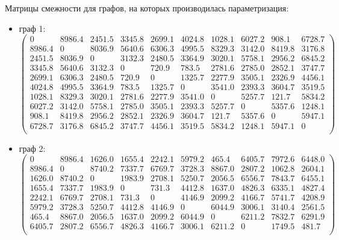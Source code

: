 Матрицы смежности для графов, на которых производилась параметризация:
\begin{itemize}
	\item граф 1:
	$$
	\begin{pmatrix}
		0 & 8986.4 & 2451.5 & 3345.8 & 2699.1 & 4024.8 & 1028.1 & 6027.2 & 908.1 & 6728.7\\
		8986.4 & 0 & 8036.9 & 5640.6 & 6306.3 & 4995.5 & 8329.3 & 3142.0 & 8419.8 & 3176.8\\
		2451.5 & 8036.9 & 0 & 3132.3 & 2480.5 & 3364.9 & 3020.1 & 5758.1 & 2956.2 & 6845.2\\
		3345.8 & 5640.6 & 3132.3 & 0 & 720.9 & 783.5 & 2781.6 & 2785.0 & 2852.1 & 3747.7\\
		2699.1 & 6306.3 & 2480.5 & 720.9 & 0 & 1325.7 & 2277.9 & 3505.1 & 2326.9 & 4456.1\\
		4024.8 & 4995.5 & 3364.9 & 783.5 & 1325.7 & 0 & 3541.0 & 2393.3 & 3604.7 & 3519.5\\
		1028.1 & 8329.3 & 3020.1 & 2781.6 & 2277.9 & 3541.0 & 0 & 5257.7 & 121.7 & 5834.2\\
		6027.2 & 3142.0 & 5758.1 & 2785.0 & 3505.1 & 2393.3 & 5257.7 & 0 & 5357.6 & 1248.1\\
		908.1 & 8419.8 & 2956.2 & 2852.1 & 2326.9 & 3604.7 & 121.7 & 5357.6 & 0 & 5947.1\\
		6728.7 & 3176.8 & 6845.2 & 3747.7 & 4456.1 & 3519.5 & 5834.2 & 1248.1 & 5947.1 & 0\\
	\end{pmatrix}
	$$
	\item граф 2:
	$$
	\begin{pmatrix}
		0 & 8986.4 & 1626.0 & 1655.4 & 2242.1 & 5979.2 & 465.4 & 6405.7 & 7972.6 & 6448.0\\
		8986.4 & 0 & 8740.2 & 7337.7 & 6769.7 & 3728.3 & 8867.0 & 2807.2 & 1062.8 & 2604.1\\
		1626.0 & 8740.2 & 0 & 1983.9 & 2708.1 & 5250.7 & 2056.5 & 6556.7 & 7843.7 & 6455.1\\
		1655.4 & 7337.7 & 1983.9 & 0 & 731.3 & 4412.8 & 1637.0 & 4826.3 & 6335.1 & 4827.4\\
		2242.1 & 6769.7 & 2708.1 & 731.3 & 0 & 4146.9 & 2099.2 & 4166.7 & 5741.7 & 4208.9\\
		5979.2 & 3728.3 & 5250.7 & 4412.8 & 4146.9 & 0 & 6044.9 & 3006.1 & 3140.4 & 2561.5\\
		465.4 & 8867.0 & 2056.5 & 1637.0 & 2099.2 & 6044.9 & 0 & 6211.2 & 7832.7 & 6291.9\\
		6405.7 & 2807.2 & 6556.7 & 4826.3 & 4166.7 & 3006.1 & 6211.2 & 0 & 1749.5 & 481.7\\

\end{pmatrix}$$
\end{itemize}

